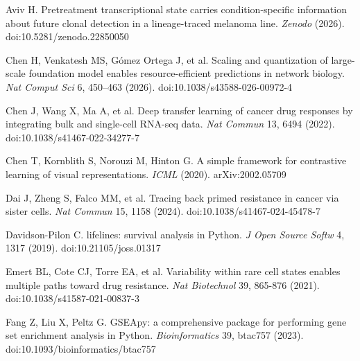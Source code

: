 \documentclass[11pt,a4paper]{article}
\begin{document}
\noindent Aviv H. Pretreatment transcriptional state carries condition-specific information about future clonal detection in a lineage-traced melanoma line. \emph{Zenodo} (2026). doi:10.5281/zenodo.22850050 \par\vspace{2pt}

\noindent Chen H, Venkatesh MS, G\'omez Ortega J, et al. Scaling and quantization of large-scale foundation model enables resource-efficient predictions in network biology. \emph{Nat Comput Sci} 6, 450--463 (2026). doi:10.1038/s43588-026-00972-4\par\vspace{2pt}

\noindent Chen J, Wang X, Ma A, et al. Deep transfer learning of cancer drug responses by integrating bulk and single-cell RNA-seq data. \emph{Nat Commun} 13, 6494 (2022). doi:10.1038/s41467-022-34277-7 \par\vspace{2pt}

\noindent Chen T, Kornblith S, Norouzi M, Hinton G. A simple framework for contrastive learning of visual representations. \emph{ICML} (2020). arXiv:2002.05709\par\vspace{2pt}

\noindent Dai J, Zheng S, Falco MM, et al. Tracing back primed resistance in cancer via sister cells. \emph{Nat Commun} 15, 1158 (2024). doi:10.1038/s41467-024-45478-7 \par\vspace{2pt}

\noindent Davidson-Pilon C. lifelines: survival analysis in Python. \emph{J Open Source Softw} 4, 1317 (2019). doi:10.21105/joss.01317\par\vspace{2pt}

\noindent Emert BL, Cote CJ, Torre EA, et al. Variability within rare cell states enables multiple paths toward drug resistance. \emph{Nat Biotechnol} 39, 865-876 (2021). doi:10.1038/s41587-021-00837-3 \par\vspace{2pt}

\noindent Fang Z, Liu X, Peltz G. GSEApy: a comprehensive package for performing gene set enrichment analysis in Python. \emph{Bioinformatics} 39, btac757 (2023). doi:10.1093/bioinformatics/btac757\par\vspace{2pt}
\end{document}
